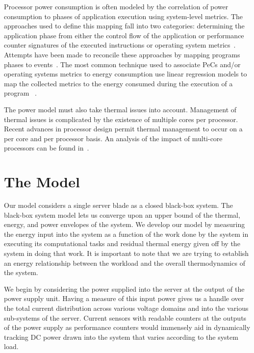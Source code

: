 \documentclass[times, 10pt, finalversion]{usetex-v1}
\begin{document}
Processor power consumption is often modeled by the correlation of power
consumption to phases of application execution using system-level
metrics.  The approaches used to define this mapping fall into two
categories: determining the application phase from either the control
flow of the application or performance counter signatures of the
executed instructions or operating system
metrics~\cite{Contreras2005}\cite{Bellosa2003}\cite{Isci2003a}\cite{Isci2003b}.
Attempts have been made to reconcile these approaches by mapping
programs phases to events~\cite{Isci2006}.  The most common technique
used to associate PeCs and/or operating systems metrics to energy
consumption use linear regression models to map the collected metrics to the
energy consumed during the execution of a program~
\cite{Contreras2005}\cite{Isci2003b}\cite{Bircher2007}.

The power model must also take thermal issues into account.  Management
of thermal issues is complicated by the existence of multiple cores per
processor.  Recent advances in processor design permit thermal
management to occur on a per core and per processor basis.  An analysis
of the impact of multi-core processors can be found
in~\cite{Donald2006}. 
\section{The Model}
\label{sec:model}
Our model considers a single server blade as a closed black-box system.
The black-box system model lets us converge upon an upper bound of the
thermal, energy, and power envelopes of the system.  We develop our
model by measuring the energy input into the system as a function of the
work done by the system in executing its computational tasks and 
residual thermal energy given off by the system in doing that work. It
is important to note that we are trying to establish an energy
relationship between the workload and the overall thermodynamics of the
system.

We begin by considering the power supplied into the server at the output
of the power supply unit. Having a measure of this input power gives us
a handle over the total current distribution across various voltage
domains and into the various sub-systems of the server. Current sensors
with readable counters  at the outputs of the power supply as
performance counters would immensely aid in dynamically tracking DC
power drawn into the system that varies according to the system load.
\end{document}
